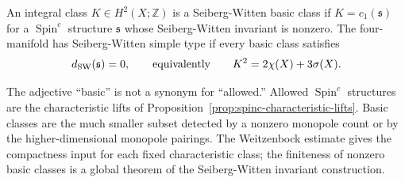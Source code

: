 \begin{definition}
\label{def:sw-basic-class-simple-type}
An integral class \(K\in H^2(X;\mathbb Z)\) is a Seiberg-Witten basic class
if \(K=c_1(\mathfrak s)\) for a \(\operatorname{Spin}^c\) structure
\(\mathfrak s\) whose Seiberg-Witten invariant is nonzero.  The four-manifold
has Seiberg-Witten simple type if every basic class satisfies
\begin{equation}
  d_{\rm SW}(\mathfrak s)=0,
  \qquad\text{equivalently}\qquad
  K^2=2\chi(X)+3\sigma(X).
  \label{eq:sw-simple-type-condition}
\end{equation}
\end{definition}

The adjective ``basic'' is not a synonym for ``allowed.''  Allowed
\(\operatorname{Spin}^c\) structures are the characteristic lifts of
Proposition~\ref{prop:spinc-characteristic-lifts}.  Basic classes are the
much smaller subset detected by a nonzero monopole count or by the
higher-dimensional monopole pairings.  The Weitzenbock estimate gives the
compactness input for each fixed characteristic class; the finiteness of
nonzero basic classes is a global theorem of the Seiberg-Witten invariant
construction.

